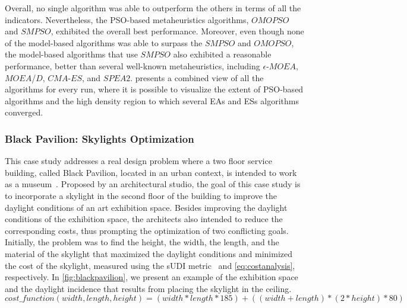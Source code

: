 Overall, no single algorithm was able to outperform the others in terms of all the indicators. Nevertheless, the \ac{PSO}-based metaheuristics algorithms, $OMOPSO$ and $SMPSO$, exhibited the overall best performance. Moreover, even though none of the model-based algorithms was able to surpass the $SMPSO$ and $OMOPSO$, the model-based algorithms that use $SMPSO$ also exhibited a reasonable performance, better than several well-known metaheuristics, including $\epsilon$-$MOEA$, $MOEA$/$D$, $CMA$-$ES$, and $SPEA2$.  presents a combined view of all the algorithms for every run, where it is possible to visualize the extent of \ac{PSO}-based algorithms and the high density region to which several \acp{EA} and \acp{ES} algorithms converged.

\subsubsection{Black Pavilion: Skylights Optimization}
This case study addresses a real design problem where a two floor service building, called Black Pavilion, located in an urban context, is intended to work as a museum~\cite{Caetano2018,IP2019MOO}. Proposed by an architectural studio, the goal of this case study is to incorporate a skylight in the second floor of the building to improve the daylight conditions of an art exhibition space. Besides improving the daylight conditions of the exhibition space, the architects also intended to reduce the corresponding costs, thus prompting the optimization of two conflicting goals. Initially, the problem was to find the height, the width, the length, and the material of the skylight that maximized the daylight conditions and minimized the cost of the skylight, measured using the \ac{sUDI} metric~\cite{Nabil2006} and \cref{eq:costanalysis}, respectively. In \cref{fig:blackpavilion}, we present an example of the exhibition space and the daylight incidence that results from placing the skylight in the ceiling.
\begin{equation} \label{eq:costanalysis}
cost\_function(width, length, height) = (width * length * 185) + ((width + length) * ( 2 * height) * 80)
\end{equation}

